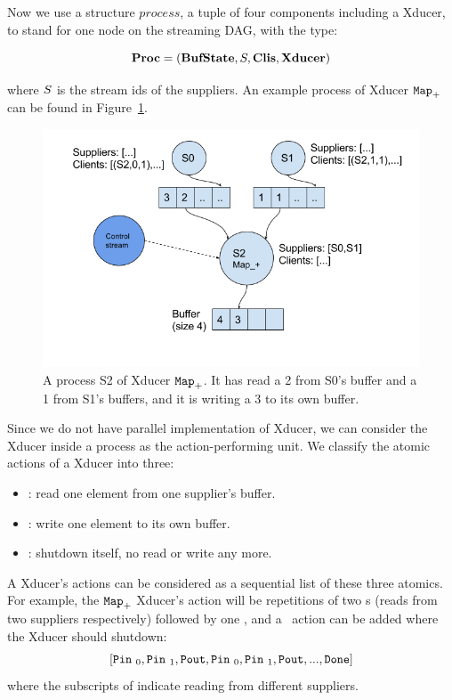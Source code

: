 Now we use a structure $process$, a tuple of four components including a Xducer, to stand for one node on the streaming DAG, with the type:

$$ \proc  =  (\bufst, \S, \clis, \xducer) $$

where $\S$ is the stream ids of the suppliers. An example process of Xducer $\map{+}$ can be found in Figure~\ref{fig:process}.

\begin{figure}
	\centering
	\includegraphics[width=1.0\textwidth]{fig/process}
	\caption{A process S2 of Xducer $\map{+}$. 
		It has read a 2 from S0's buffer and a 1 from S1's buffers, and it is writing a 3 to its own buffer.}
	\label{fig:process}
\end{figure}

Since we do not have parallel implementation of Xducer, we can consider the Xducer inside a process as the action-performing unit. 
We classify the atomic actions of a Xducer into three:
\begin{itemize}
	\item \pin: read one element from one supplier's buffer.
	\item \pout : write one element to its own buffer.
	\item \done: shutdown itself, no read or write any more.
\end{itemize}

A Xducer's actions can be considered as a sequential list of these three atomics.
For example,  the $\map{+}$ Xducer's action will be repetitions of two \pin s (reads from two suppliers respectively) followed by one \pout, and 
a \done \ action can be added where the Xducer should shutdown:
$$[\pin_0, \pin_1, \pout, \pin_0, \pin_1, \pout,... ,\done]$$
 where the subscripts of \pin indicate reading from different suppliers.


